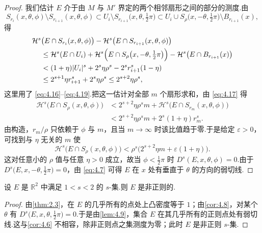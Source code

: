 \begin{proof}
我们估计 $E$ 介于由 $M$ 与 $M'$ 界定的两个相邻扇形之间的部分的测度.由
\[
  S_{r_i}(x,\theta,\phi)\setminus S_{r_{i+1}}(x,\theta,\phi)
  \subset U_i\setminus S_{r_{i+1}}\bigl(x,\theta,\tfrac{1}{2}\pi\bigr)
  \subset U_i\cup S_\rho\bigl(x,-\theta,\tfrac{1}{2}\pi\bigr)\setminus B_{r_{i+1}}(x),
\]
得
\begin{align*}
  \mathcal{H}^{s}&\bigl(E\cap S_{r_i}(x,\theta,\phi)\bigr)-\mathcal{H}^{s}\bigl(E\cap S_{r_{i+1}}(x,\theta,\phi)\bigr)\\
  &\leq\mathcal{H}^{s}(E\cap U_i)+\mathcal{H}^{s}\Bigl(E\cap S_\rho\bigl(x,-\theta,\tfrac{1}{2}\pi\bigr)\Bigr)
    -\mathcal{H}^{s}\bigl(E\cap B_{r_{i+1}}(x)\bigr)\\
  &<(1+\eta)|U_i|^{s}+2^{s}\eta\rho^{s}-2^{s}r_{i+1}^{s}(1-\eta)\\
  &\leq 2^{s+1}\eta r_{i+1}^{s}+2^{s}\eta\rho^{s}
  \leq 2^{s+2}\eta\rho^{s},
\end{align*}
这里用了 \eqref{eq:4.16}--\eqref{eq:4.19}.把这一估计对全部 $m$ 个扇形求和，由 \eqref{eq:4.17} 得
\begin{align*}
  \mathcal{H}^{s}\bigl(E\cap S_\rho(x,\theta,\phi)\bigr)
  &<2^{s+2}\eta\rho^{s}m+\mathcal{H}^{s}\bigl(E\cap S_{r_m}(x,\theta,\phi)\bigr)\\
  &<2^{s+2}\eta\rho^{s}m+2^{s}(1+\eta)r_m^{s}.
\end{align*}
由构造，$r_m/\rho$ 只依赖于 $\phi$ 与 $m$，且当 $m\to\infty$ 时该比值趋于零.于是给定 $\varepsilon>0$，可找到与 $\eta$ 无关的 $m$ 使
\[
  \mathcal{H}^{s}\bigl(E\cap S_\rho(x,\theta,\phi)\bigr)<\rho^{s}\bigl(2^{s+2}\eta m+\varepsilon(1+\eta)\bigr).
\]
这对任意小的 $\rho$ 值与任意 $\eta>0$ 成立，故当 $\phi<\frac{1}{2}\pi$ 时 $D^s(E,x,\theta,\phi)=0$.由于 $D^s\bigl(E,x,-\theta,\frac{1}{2}\pi\bigr)=0$，由 \eqref{eq:4.7} 可得 $E$ 在 $x$ 处有垂直于 $\theta$ 的方向的弱切线.
\end{proof}

\begin{corollary}\label{cor:4.10}
设 $E$ 是 $\mathbb{R}^2$ 中满足 $1<s<2$ 的 $s$-集.则 $E$ 是非正则的.
\end{corollary}

\begin{proof}
由\cref{thm:2.3}，在 $E$ 的几乎所有的点处上凸密度等于 $1$；由\cref{cor:4.8}，对某个 $\theta$ 有 $D^s\bigl(E,x,\theta,\frac{1}{2}\pi\bigr)=0$.于是由\cref{lem:4.9}，集合 $E$ 在其几乎所有的正则点处有弱切线.这与\cref{cor:4.6} 不相容，除非正则点之集测度为零；此时 $E$ 是非正则 $s$-集.
\end{proof}


